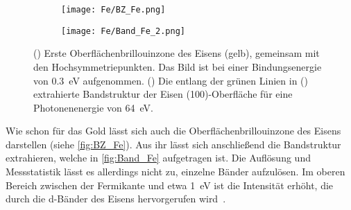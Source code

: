         \begin{figure}
            \begin{subfigure}[t]{0.34\textwidth}
                \centering
                \texttt{[image: Fe/BZ\_Fe.png]}
                \subcaption{}
                \label{fig:BZ_Fe}
            \end{subfigure}
            \begin{subfigure}[t]{0.62\textwidth}
                \centering
                \texttt{[image: Fe/Band\_Fe\_2.png]}
                \subcaption{}
                \label{fig:Band_Fe}
            \end{subfigure}
            \caption{() Erste Oberflächenbrillouinzone des Eisens (gelb), gemeinsam mit den Hochsymmetriepunkten. Das Bild ist bei einer Bindungsenergie von \SI{0.3}{\electronvolt} aufgenommen.
            () Die entlang der grünen Linien in () extrahierte Bandstruktur der Eisen (100)-Oberfläche für eine Photonenenergie von \SI{64}{\electronvolt}.}
        \end{figure}
        Wie schon für das Gold lässt sich auch die Oberflächenbrillouinzone des Eisens darstellen (siehe \autoref{fig:BZ_Fe}). 
        Aus ihr lässt sich anschließend die Bandstruktur extrahieren, welche in \autoref{fig:Band_Fe} aufgetragen ist.
        Die Auflösung und Messstatistik lässt es allerdings nicht zu, einzelne Bänder aufzulösen. %
        Im oberen Bereich zwischen der Fermikante und etwa \SI{1}{\electronvolt} ist die Intensität erhöht, die durch die d-Bänder des Eisens hervorgerufen wird~\cite{callaway_energy_1977}.        

